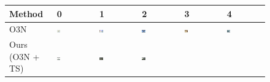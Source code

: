\iffalse
\begin{figure}[t]
    \centering
        \begin{tabu} to \textwidth {|X[c,m]|X[c,m]X[c,m]X[c,m]X[c,m]X[c,m]|}
            \hline
            Method & 0 & 1 & 2 & 3 & 4 \\ \hline \hline
            O3N & 
            \includegraphics[width=0.1\textwidth]{images/o3vsmooth/o3/0.png}\vspace{2mm} & %
            \includegraphics[width=0.1\textwidth]{images/o3vsmooth/o3/1.png}\vspace{2mm} &
            \includegraphics[width=0.1\textwidth]{images/o3vsmooth/o3/2.png}\vspace{2mm} & 
            \includegraphics[width=0.1\textwidth]{images/o3vsmooth/o3/3.png}\vspace{2mm} &
            \includegraphics[width=0.1\textwidth]{images/o3vsmooth/o3/4.png}\vspace{2mm} \\
            Ours (O3N + TS) & 
            \includegraphics[width=0.1\textwidth]{images/o3vsmooth/smooth/0.png} &
            \includegraphics[width=0.1\textwidth]{images/o3vsmooth/smooth/1.png} &
            \includegraphics[width=0.1\textwidth]{images/o3vsmooth/smooth/2.png} & 

\end{tabu}
\end{figure}
